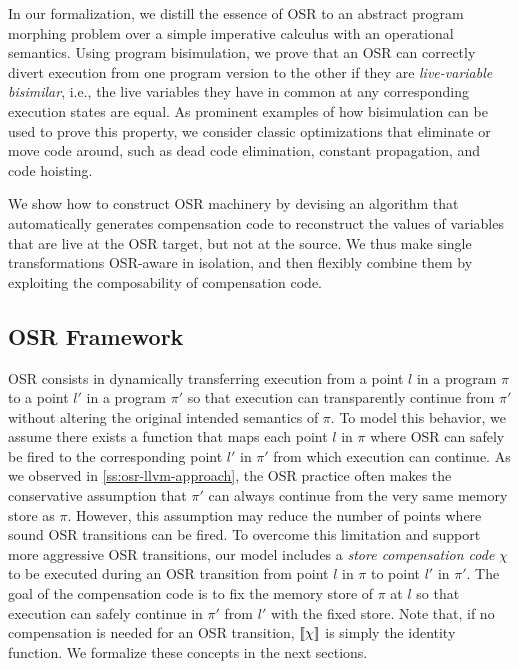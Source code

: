 In our formalization, we distill the essence of OSR to an abstract program morphing problem over a simple imperative calculus with an operational semantics. %
Using program bisimulation, we prove that an OSR can correctly divert execution from one program version to the other if they are {\em live-variable bisimilar}, i.e., the live variables they have in common at any corresponding execution states are equal. As prominent examples of how bisimulation can be used to prove this property, we consider classic optimizations that eliminate or move code around, such as dead code elimination, constant propagation, and code hoisting.

We show how to construct OSR machinery by devising an algorithm that automatically generates compensation code to reconstruct the values of variables that are live at the OSR target, but not at the source. We thus make single transformations OSR-aware in isolation, and then flexibly combine them by exploiting the composability of compensation code.




\subsection{OSR Framework}
OSR consists in dynamically transferring execution from a point $l$ in a program $\pi$ to a point $l'$ in a program $\pi'$ so that execution can transparently continue from $\pi'$ without altering the original intended semantics of $\pi$. To model this behavior, we assume there exists a function that maps each point $l$ in $\pi$ where OSR can safely be fired to the corresponding point $l'$ in $\pi'$ from which execution can continue.
As we observed in \mysection\ref{ss:osr-llvm-approach}, the OSR practice often makes the conservative assumption that $\pi'$ can always continue from the very same memory store as $\pi$. However, this assumption may reduce the number of points where sound OSR transitions can be fired. To overcome this limitation and support more aggressive OSR transitions, our model includes a {\em store compensation code} $\chi$ to be executed during an OSR transition from point $l$ in $\pi$ to point $l'$ in $\pi'$. The goal of the compensation code is to fix the memory store of $\pi$ at $l$ so that execution can safely continue in $\pi'$ from $l'$ with the fixed store. Note that, if no compensation is needed for an OSR transition, $[\![\chi]\!]$ is simply the identity function. We formalize these concepts in the next sections.

